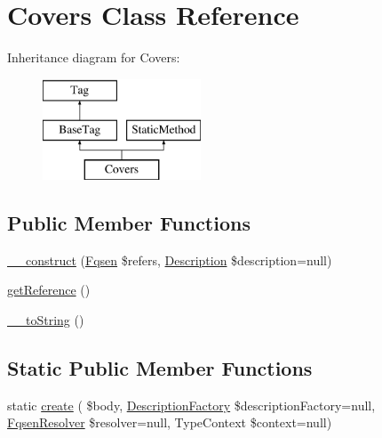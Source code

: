 \hypertarget{classphp_documentor_1_1_reflection_1_1_doc_block_1_1_tags_1_1_covers}{}\section{Covers Class Reference}
\label{classphp_documentor_1_1_reflection_1_1_doc_block_1_1_tags_1_1_covers}
Inheritance diagram for Covers\+:\begin{figure}[H]
\begin{center}
\leavevmode
\includegraphics[height=3.000000cm]{classphp_documentor_1_1_reflection_1_1_doc_block_1_1_tags_1_1_covers}
\end{center}
\end{figure}
\subsection*{Public Member Functions}
\begin{DoxyCompactItemize}
\item 
\mbox{\hyperlink{classphp_documentor_1_1_reflection_1_1_doc_block_1_1_tags_1_1_covers_a606211073a6fa4ef434859f156764469}{\+\_\+\+\_\+construct}} (\mbox{\hyperlink{classphp_documentor_1_1_reflection_1_1_fqsen}{Fqsen}} \$refers, \mbox{\hyperlink{classphp_documentor_1_1_reflection_1_1_doc_block_1_1_description}{Description}} \$description=null)
\item 
\mbox{\hyperlink{classphp_documentor_1_1_reflection_1_1_doc_block_1_1_tags_1_1_covers_a1f54573d48e07a7250b74f80b8493f1d}{get\+Reference}} ()
\item 
\mbox{\hyperlink{classphp_documentor_1_1_reflection_1_1_doc_block_1_1_tags_1_1_covers_a7516ca30af0db3cdbf9a7739b48ce91d}{\+\_\+\+\_\+to\+String}} ()
\end{DoxyCompactItemize}
\subsection*{Static Public Member Functions}
\begin{DoxyCompactItemize}
\item 
static \mbox{\hyperlink{classphp_documentor_1_1_reflection_1_1_doc_block_1_1_tags_1_1_covers_ae9331a6a857ec2381e5dba2df9e1f0b9}{create}} ( \$body, \mbox{\hyperlink{classphp_documentor_1_1_reflection_1_1_doc_block_1_1_description_factory}{Description\+Factory}} \$description\+Factory=null, \mbox{\hyperlink{classphp_documentor_1_1_reflection_1_1_fqsen_resolver}{Fqsen\+Resolver}} \$resolver=null, Type\+Context \$context=null)
\end{DoxyCompactItemize}
